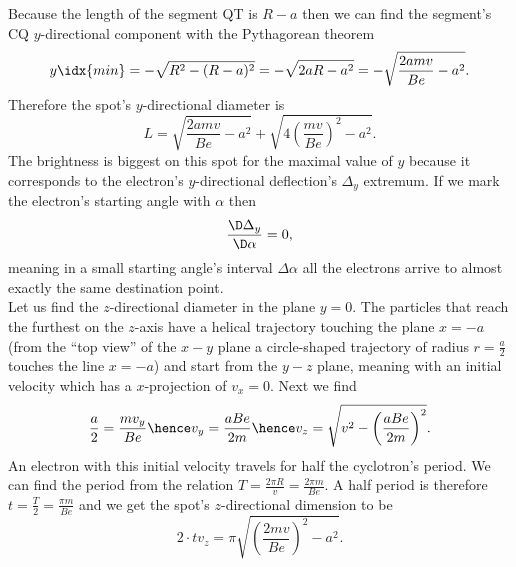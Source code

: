 \documentclass[11pt]{article}
\begin{document}
\begin{center}
\end{center}
Because the length of the segment QT is $R-a$ then we can find the segment’s CQ $y$-directional component with the Pythagorean theorem
$$y\idx{min}=-\sqrt{R^2-(R-a)^2} = -\sqrt{2aR-a^2}=-\sqrt{\frac{2amv}{Be}-a^2}.$$
Therefore the spot’s $y$-directional diameter is
$$L=\sqrt{\frac{2amv}{Be}-a^2} + \sqrt{4\left(\frac{mv}{Be}\right)^2-a^2}.$$
The brightness is biggest on this spot for the maximal value of $y$ because it corresponds to the electron’s $y$-directional deflection’s $\Delta_y$ extremum. If we mark the electron’s starting angle with $\alpha$ then 
$$\frac{\D \Delta_y}{\D \alpha}=0,$$
meaning in a small starting angle’s interval $\Delta\alpha$ all the electrons arrive to almost exactly the same destination point.\\
Let us find the $z$-directional diameter in the plane $y=0$. The particles that reach the furthest on the $z$-axis have a helical trajectory touching the plane $x=-a$ (from the “top view” of the $x-y$ plane a circle-shaped trajectory of radius $r=\frac a2$ touches the line $x=-a$) and start from the $y-z$ plane, meaning with an initial velocity which has a $x$-projection of $v_x=0$. Next we find
$$\frac a2=\frac {mv_y}{Be}\hence v_y=\frac{aBe}{2m}\hence v_z=\sqrt{v^2-\left(\frac{aBe}{2m}\right)^2}.$$
An electron with this initial velocity travels for half the cyclotron’s period. We can find the period from the relation $T=\frac{2\pi R}{v} = \frac{2\pi m}{Be}$. A half period is therefore $t=\frac{T}{2}=\frac{\pi m}{Be}$ and we get the spot’s $z$-directional dimension to be 
$$2\cdot tv_z=\pi\sqrt{\left(\frac{2mv}{Be}\right)^2-a^2}.$$
\probend
\bigskip
\end{document}
